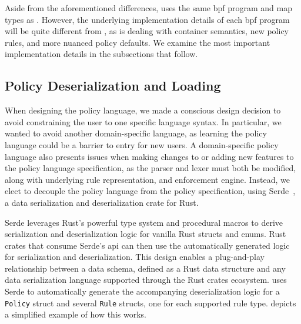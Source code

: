 Aside from the aforementioned differences, \bpfcontain{} uses the same \gls{bpf} program
and map types as \bpfbox{}. However, the underlying implementation details of each
\gls{bpf} program will be quite different from \bpfbox{}, as \bpfcontain{} is dealing with
container semantics, new policy rules, and more nuanced policy defaults. We examine the
most important implementation details in the subsections that follow.



\subsection{Policy Deserialization and Loading}%
\label{ss:bpfcontain-serde}

When designing the \bpfcontain{} policy language, we made a conscious design decision to
avoid constraining the user to one specific language syntax. In particular, we wanted to
avoid another domain-specific language, as learning the policy language could be a barrier
to entry for new users. A domain-specific policy language also presents issues when making
changes to or adding new features to the policy language specification, as the parser and
lexer must both be modified, along with underlying rule representation, and enforcement
engine. Instead, we elect to decouple the policy language from the policy specification,
using Serde~\cite{serde}, a data serialization and deserialization crate for Rust.

Serde leverages Rust's powerful type system and procedural macros to derive serialization
and deserialization logic for vanilla Rust structs and enums. Rust crates that consume
Serde's \gls{api} can then use the automatically generated logic for serialization and
deserialization. This design enables a plug-and-play relationship between a data schema,
defined as a Rust data structure and any data serialization language supported through the
Rust crates ecosystem. \bpfcontain{} uses Serde to automatically generate the accompanying
deserialization logic for a \texttt{Policy} struct and several \texttt{Rule} structs, one
for each supported rule type.  depicts a simplified example of
how this works.


